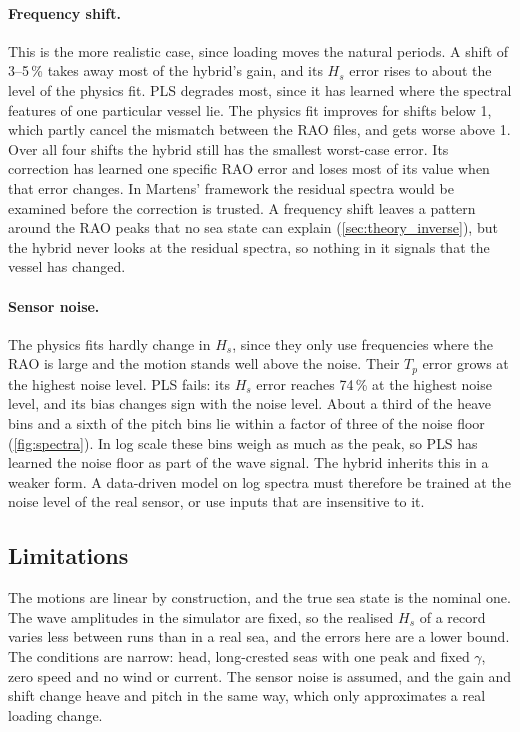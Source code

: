 \documentclass[10pt,a4paper,twocolumn,twoside]{article}
\newcommand{\Hs}{H_{s}}
\newcommand{\Tp}{T_{p}}
\newcommand{\pct}[1]{#1\,\%}
\begin{document}
\paragraph{Frequency shift.}
This is the more realistic case, since loading moves the natural periods. A shift of 3--5\,\% takes
away most of the hybrid's gain, and its $\Hs$ error rises to about the level of the physics fit.
PLS degrades most, since it has learned where the spectral features of one particular vessel lie.
The physics fit improves for shifts below 1, which partly cancel the mismatch between the RAO
files, and gets worse above 1. Over all four shifts the hybrid still has the smallest worst-case
error. Its correction has learned one specific RAO error and loses most of its value when that
error changes. In Martens' framework the residual spectra would be examined before the correction
is trusted. A frequency shift leaves a pattern around the RAO peaks that no sea state can explain
(\cref{sec:theory_inverse}), but the hybrid never looks at the residual spectra, so nothing in it
signals that the vessel has changed.

\paragraph{Sensor noise.}
The physics fits hardly change in $\Hs$, since they only use frequencies where the RAO is large and
the motion stands well above the noise. Their $\Tp$ error grows at the highest noise level. PLS
fails: its $\Hs$ error reaches \pct{74} at the highest noise level, and its bias changes sign with
the noise level. About a third of the heave bins and a sixth of the pitch bins lie within a factor
of three of the noise floor (\cref{fig:spectra}). In log scale these bins weigh as much as the
peak, so PLS has learned the noise floor as part of the wave signal. The hybrid inherits this in a
weaker form. A data-driven model on log spectra must therefore be trained at the noise level of
the real sensor, or use inputs that are insensitive to it.

\subsection{Limitations}

The motions are linear by construction, and the true sea state is the nominal one. The wave
amplitudes in the simulator are fixed, so the realised $\Hs$ of a record varies less between runs
than in a real sea, and the errors here are a lower bound. The conditions are narrow: head,
long-crested seas with one peak and fixed $\gamma$, zero speed and no wind or current. The sensor
noise is assumed, and the gain and shift change heave and pitch in the same way, which only
approximates a real loading change.
\end{document}
